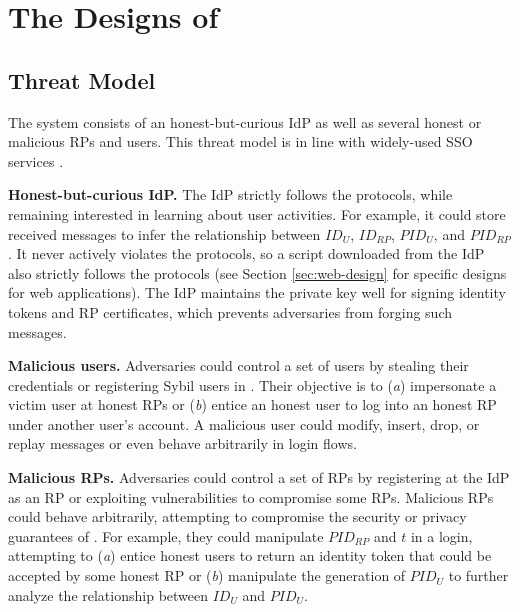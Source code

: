 \section{The Designs of \usso}
\label{sec:UPPRESSO}


\subsection{Threat Model}
\label{subsec:threatmodel}
The system consists of an honest-but-curious IdP as well as several honest or malicious RPs and users. %
This threat model is in line with widely-used SSO services \cite{OpenIDConnect,rfc6749, SAML, SAMLIdentifier}.

\noindent \textbf{Honest-but-curious IdP.} The IdP strictly follows the protocols,
 while remaining interested in learning about user activities.
For example, it could store received messages to infer the relationship between $ID_U$, $ID_{RP}$, $PID_{U}$, and $PID_{RP}$.
It never actively violates the protocols, so a script downloaded from the IdP also strictly follows the protocols (see Section \ref{sec:web-design} for specific designs for web applications).
The IdP maintains the private key well for signing identity tokens and RP certificates, %
which prevents adversaries from forging such messages.

\noindent \textbf{Malicious users.} Adversaries could control a set of users by stealing their credentials or registering Sybil users in \usso.
 Their objective \cite{SPRESSO, FettKS14} is to (\emph{a}) impersonate a victim user at honest RPs or (\emph{b}) entice an honest user to log into an honest RP under another user's account.
A malicious user could modify, insert, drop, or replay messages or even behave arbitrarily in login flows.

\noindent \textbf{Malicious RPs.}
Adversaries could control a set of RPs by registering at the IdP as an RP or exploiting vulnerabilities to compromise some RPs.
Malicious RPs could behave arbitrarily, attempting to compromise the security or privacy guarantees of \usso.
For example, they could manipulate $PID_{RP}$ and $t$ in a login, attempting to (\emph{a}) entice honest users to return an identity token that could be accepted by some honest RP or (\emph{b}) manipulate the generation of $PID_U$ to further analyze the relationship between $ID_U$ and $PID_U$.

